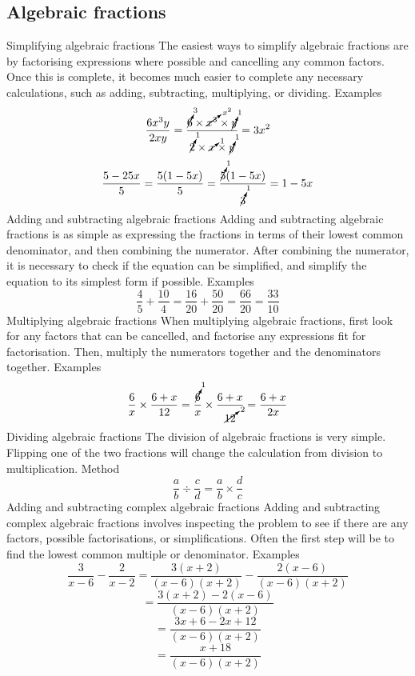 \begin{outline}
\subsection{Algebraic fractions}
	\1 Simplifying algebraic fractions
		\2 The easiest ways to simplify algebraic fractions are by factorising expressions where possible and cancelling any common factors. Once this is complete, it becomes much easier to complete any necessary calculations, such as adding, subtracting, multiplying, or dividing.
			\3 Examples
				\[\frac{6x^3 y}{2xy} = \frac{\cancelto{3}{6} \times \cancelto{x^2}{x^3} \times \cancelto{1}{y}}{\cancelto{1}{2}\times \cancelto{1}{x} \times \cancelto{1}{y}} = 3x^2\]
				\[\frac{5-25x}{5} = \frac{5(1-5x)}{5} = \frac{\cancelto{1}{5}(1-5x)}{\cancelto{1}{3}} = 1-5x\]
	\1 Adding and subtracting algebraic fractions
		\2 Adding and subtracting algebraic fractions is as simple as expressing the fractions in terms of their lowest common denominator, and then combining the numerator. After combining the numerator, it is necessary to check if the equation can be simplified, and simplify the equation to its simplest form if possible.
			\3 Examples
				\[\frac{4}{5}+\frac{10}{4} = \frac{16}{20}+\frac{50}{20} = \frac{66}{20} = \frac{33}{10}\]
	\1 Multiplying algebraic fractions
		\2 When multiplying algebraic fractions, first look for any factors that can be cancelled, and factorise any expressions fit for factorisation. Then, multiply the numerators together and the denominators together.
			\3 Examples
				\[\frac{6}{x}\times\frac{6+x}{12} = \frac{\cancelto{1}{6}}{x}\times\frac{6+x}{\cancelto{2}{12}} = \frac{6+x}{2x}\]
	\1 Dividing algebraic fractions
		\2 The division of algebraic fractions is very simple. Flipping one of the two fractions will change the calculation from division to multiplication.
			\3 Method
				\[\frac{a}{b}\div\frac{c}{d} = \frac{a}{b}\times\frac{d}{c}\]
	\1 Adding and subtracting complex algebraic fractions
		\2 Adding and subtracting complex algebraic fractions involves inspecting the problem to see if there are any factors, possible factorisations, or simplifications. Often the first step will be to find the lowest common multiple or denominator.
			\3 Examples
				\[\frac{3}{x-6}-\frac{2}{x-2} = \frac{3(x+2)}{(x-6)(x+2)}-\frac{2(x-6)}{(x-6)(x+2)}\]
				\[= \frac{3(x+2)-2(x-6)}{(x-6)(x+2)}\]
				\[= \frac{3x+6-2x+12}{(x-6)(x+2)}\]
				\[= \frac{x+18}{(x-6)(x+2)}\]

\0

\end{outline}
